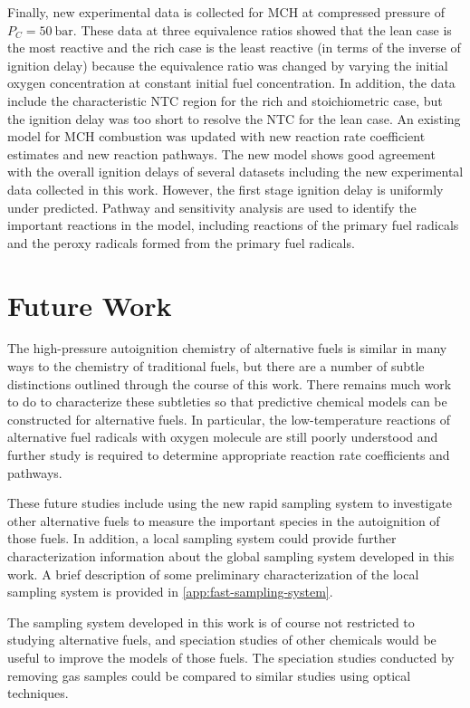 \documentclass[../main.tex]{subfiles}
\begin{document}
Finally, new experimental data is collected for MCH at compressed
pressure of $P_C=\SI{50}{\bar}$. These data at three equivalence ratios
showed that the lean case is the most reactive and the rich case is the
least reactive (in terms of the inverse of ignition delay) because the
equivalence ratio was changed by varying the initial oxygen concentration
at constant initial fuel concentration. In addition, the data include the
characteristic NTC region for the rich and stoichiometric case, but the
ignition delay was too short to resolve the NTC for the lean case. An
existing model for MCH combustion was updated with new reaction rate
coefficient estimates and new reaction pathways. The new model shows
good agreement with the overall ignition delays of several datasets
including the new experimental data collected in this work. However,
the first stage ignition delay is uniformly under predicted. Pathway
and sensitivity analysis are used to identify the important reactions in
the model, including reactions of the primary fuel radicals and the peroxy
radicals formed from the primary fuel radicals.

\section{Future Work}
\label{sec:future-work}

The high-pressure autoignition chemistry of alternative fuels is similar
in many ways to the chemistry of traditional fuels, but there are a
number of subtle distinctions outlined through the course of this work.
There remains much work to do to characterize these subtleties so that
predictive chemical models can be constructed for alternative fuels. In
particular, the low-temperature reactions of alternative fuel radicals
with oxygen molecule are still poorly understood and further study is
required to determine appropriate reaction rate coefficients and pathways.

These future studies include using the new rapid sampling system to
investigate other alternative fuels to measure the important species
in the autoignition of those fuels. In addition, a local sampling
system could provide further characterization information about the
global sampling system developed in this work. A brief description of
some preliminary characterization of the local sampling system is
provided in \cref{app:fast-sampling-system}.

The sampling system developed in this work is of course not restricted
to studying alternative fuels, and speciation studies of other chemicals
would be useful to improve the models of those fuels. The speciation
studies conducted by removing gas samples could be compared to similar
studies using optical techniques.
\end{document}
